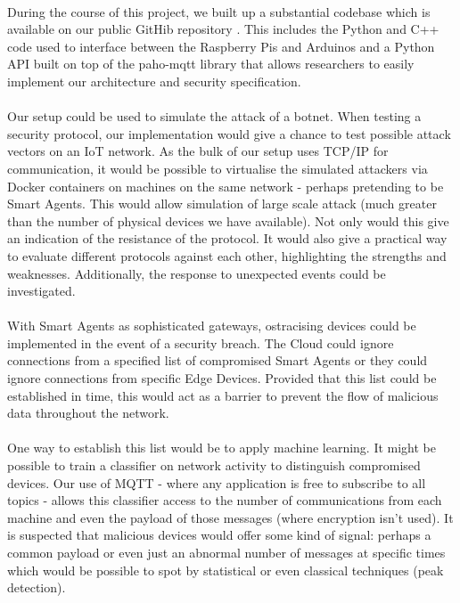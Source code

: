 \paragraph{}

During the course of this project, we built up a substantial codebase which is available on our public GitHib repository \cite{githubrepo}. This includes the Python and C++ code used to interface between the Raspberry Pis and Arduinos and a Python API built on top of the paho-mqtt library that allows researchers to easily implement our architecture and security specification.

\paragraph{}
Our setup could be used to simulate the attack of a botnet. When testing a security protocol, our implementation would give a chance to test possible attack vectors on an IoT network. As the bulk of our setup uses TCP/IP for communication, it would be possible to virtualise the simulated attackers via Docker containers on machines on the same network - perhaps pretending to be Smart Agents. This would allow simulation of large scale attack (much greater than the number of physical devices we have available). Not only would this give an indication of the resistance of the protocol. It would also give a practical way to evaluate different protocols against each other, highlighting the strengths and weaknesses. Additionally, the response to unexpected events could be investigated.

\paragraph{}
With Smart Agents as sophisticated gateways, ostracising devices could be implemented in the event of a security breach. The Cloud could ignore connections from a specified list of compromised Smart Agents or they could ignore connections from specific Edge Devices. Provided that this list could be established in time, this would act as a barrier to prevent the flow of malicious data throughout the network.

\paragraph{}
One way to establish this list would be to apply machine learning. It might be possible to train a classifier on network activity to distinguish compromised devices. Our use of MQTT - where any application is free to subscribe to all topics - allows this classifier access to the number of communications from each machine and even the payload of those messages (where encryption isn't used). It is suspected that malicious devices would offer some kind of signal: perhaps a common payload or even just an abnormal number of messages at specific times which would be possible to spot by statistical or even classical techniques (peak detection).


